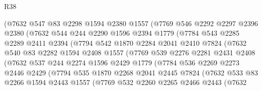 \begin{lexlean}{R38}
\begin{coremodule}
              (@7632
                @547
                @83
                @2298
                @1594
                @2380
                @1557
                (@7769
                  @546
                  @2292
                  @2297
                  @2396
                  @2380
                  (@7632
                    @544
                    @244
                    @2290
                    @1596
                    @2394
                    @1779
                    (@7784
                      @543
                      @2285
                      @2289
                      @2411
                      @2394
                      (@7794
                        @542
                        @1870
                        @2284
                        @2041
                        @2410
                        @7824
                        (@7632
                          @540
                          @83
                          @2282
                          @1594
                          @2408
                          @1557
                          (@7769
                            @539
                            @2276
                            @2281
                            @2431
                            @2408
                            (@7632
                              @537
                              @244
                              @2274
                              @1596
                              @2429
                              @1779
                              (@7784
                                @536
                                @2269
                                @2273
                                @2446
                                @2429
                                (@7794
                                  @535
                                  @1870
                                  @2268
                                  @2041
                                  @2445
                                  @7824
                                  (@7632
                                    @533
                                    @83
                                    @2266
                                    @1594
                                    @2443
                                    @1557
                                    (@7769
                                      @532
                                      @2260
                                      @2265
                                      @2466
                                      @2443
                                      (@7632

\end{coremodule}
\end{lexlean}
